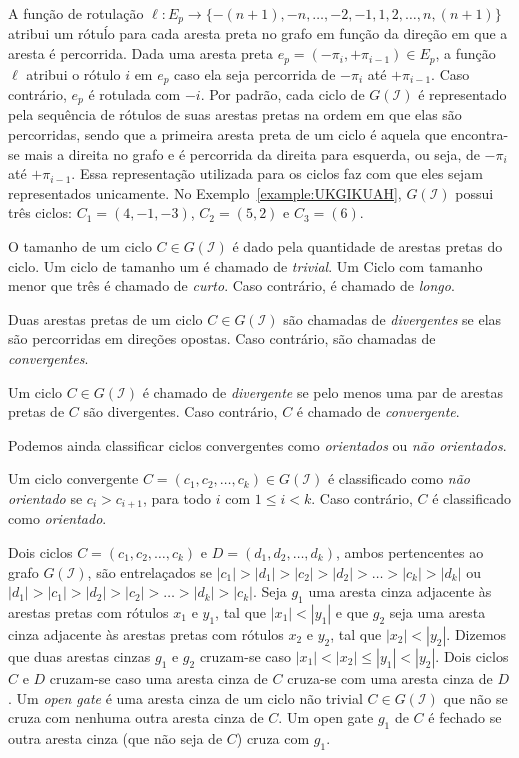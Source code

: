 A função de rotulação $\ell : E_p \rightarrow \{-(n+1),-n,\dots,-2,-1,1,2,\dots,n,(n+1)\}$ atribui um rótuĺo para cada aresta preta no grafo em função da direção em que a aresta é percorrida. Dada uma aresta preta $e_p = (-\pi_i, +\pi_{i-1}) \in E_p$, a função $\ell$ atribui o rótulo $i$ em $e_p$ caso ela seja percorrida de $-\pi_i$ até $+\pi_{i-1}$. Caso contrário, $e_p$ é rotulada com $-i$. Por padrão, cada ciclo de $G(\mathcal{I})$ é representado pela sequência de rótulos de suas arestas pretas na ordem em que elas são percorridas, sendo que a primeira aresta preta de um ciclo é aquela que encontra-se mais a direita no grafo e é percorrida da direita para esquerda, ou seja, de $-\pi_i$ até $+\pi_{i-1}$. Essa representação utilizada para os ciclos faz com que eles sejam representados unicamente. No Exemplo~\ref{example:UKGIKUAH}, $G(\mathcal{I})$ possui três ciclos: $C_1=(4,-1,-3)$, $C_2 = (5,2)$ e $C_3 = (6)$.

O tamanho de um ciclo $C\in G(\mathcal{I})$ é dado pela quantidade de arestas pretas do ciclo. Um ciclo de tamanho um é chamado de \emph{trivial}. Um Ciclo com tamanho menor que três é chamado de \emph{curto}. Caso contrário, é chamado de \emph{longo}. 

\begin{definition}
Duas arestas pretas de um ciclo $C\in G(\mathcal{I})$ são chamadas de \emph{divergentes} se elas são percorridas em direções opostas. Caso contrário, são chamadas de \emph{convergentes}.
\end{definition}
\begin{definition}
Um ciclo $C\in G(\mathcal{I})$ é chamado de \emph{divergente} se pelo menos uma par de arestas pretas de $C$ são divergentes. Caso contrário, $C$ é chamado de \emph{convergente}.
\end{definition}

Podemos ainda classificar ciclos convergentes como \emph{orientados} ou \emph{não orientados}. 

\begin{definition}
Um ciclo convergente $C = (c_1,c_2,\dots,c_k) \in G(\mathcal{I})$ é classificado como \emph{não orientado} se $c_i > c_{i+1}$, para todo $i$ com $1 \le i < k$. Caso contrário, $C$ é classificado como \emph{orientado}.
\end{definition}

Dois ciclos $C = (c_1, c_2, \ldots, c_k)$ e $D = (d_1, d_2, \ldots, d_k)$, ambos pertencentes ao grafo $G(\mathcal{I})$, são entrelaçados se $|c_1| > |d_1| > |c_2|  > |d_2| > \ldots > |c_k| > |d_k|$ ou $|d_1| > |c_1| > |d_2|  > |c_2| > \ldots > |d_k| > |c_k|$. Seja $g_1$ uma aresta cinza adjacente às arestas pretas com rótulos $x_1$ e $y_1$, tal que $|x_1| < |y_1|$ e que $g_2$ seja uma aresta cinza adjacente às arestas pretas com rótulos $x_2$ e $y_2$, tal que $|x_2| < |y_2|$. Dizemos que duas arestas cinzas $g_1$ e $g_2$ cruzam-se caso $|x_1| < |x_2| \le |y_1| < |y_2|$. Dois ciclos $C$ e $D$ cruzam-se caso uma aresta cinza de $C$ cruza-se com uma aresta cinza de $D$. Um \emph{open gate} é uma aresta cinza de um ciclo não trivial $C \in G(\mathcal{I})$ que não se cruza com nenhuma outra aresta cinza de $C$. Um open gate $g_1$ de $C$ é fechado se outra aresta cinza (que não seja de $C$) cruza com $g_1$.

